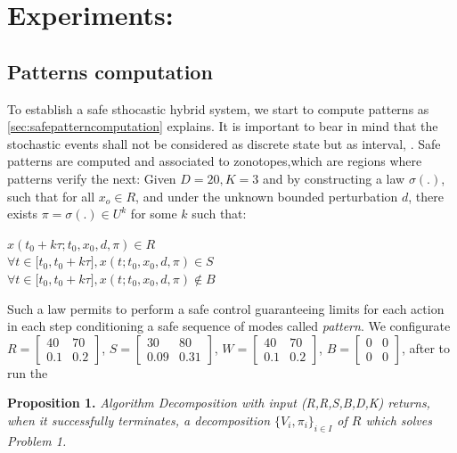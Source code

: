     \section{Experiments: }
    \subsection{Patterns computation}
    To establish a safe sthocastic hybrid system,
    we start to compute patterns as \autoref{sec:safepatterncomputation} 
    explains. It is important to bear in mind that the stochastic events 
    shall not be considered as discrete state but as interval, . Safe patterns are 
    computed and associated to zonotopes,which are regions where patterns
    verify the next: Given $D = 20, K = 3$ and by constructing a law 
    $\sigma(.)$, such that for all $x_o \in R$, and under the unknown 
    bounded perturbation $d$, there exists $\pi = \sigma(.) \in U^k$ for
     some $k$ such that:
    \begin{center}
      $x(t_0 + k\tau; t_0,x_0,d,\pi) \in R$ \\
      $\forall t\in  \lbrack t_0, t_0+k\tau\rbrack, x(t; t_0,x_0,d,\pi)
       \in S $  \\
      $\forall t\in  \lbrack t_0, t_0+k\tau\rbrack, x(t; t_0,x_0,d,\pi)
       \not\in B$
    \end{center}
    Such a law permits to perform a safe control guaranteeing limits for each
    action in each step conditioning a safe sequence of modes called 
    \emph{pattern}. We configurate $R = \begin{bmatrix} 40 & 70 \\ 0.1 & 0.2
    \end{bmatrix}$, $S = \begin{bmatrix} 30 & 80 \\ 0.09 & 0.31 \end{bmatrix}$,
    $W = \begin{bmatrix} 40 & 70 \\ 0.1 & 0.2 \end{bmatrix}$,
    $B = \begin{bmatrix} 0 & 0 \\ 0 & 0 \end{bmatrix}$, after to run the 
    
    \textbf{Proposition 1.} \emph{
      Algorithm Decomposition with input (R,R,S,B,D,K) returns, when it successfully 
      terminates, a decomposition $\lbrace V_i, \pi_i \rbrace_{i \in I}$ 
      of $R$ which solves Problem 1.
    }    
    \clearpage

